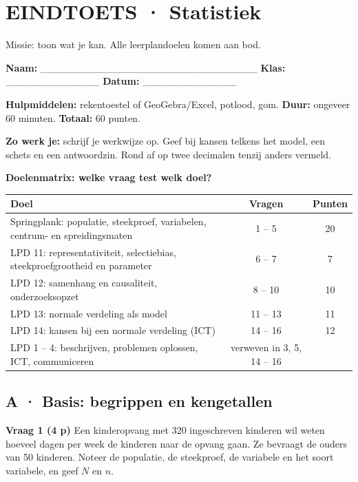 \section{EINDTOETS · Statistiek}

\begin{missie}
Missie: toon wat je kan. Alle leerplandoelen komen aan bod.
\end{missie}

\textbf{Naam:} \_\_\_\_\_\_\_\_\_\_\_\_\_\_\_\_\_\_\_\_\_\_\_\_\_\_\_\_\_\_ \quad \textbf{Klas:} \_\_\_\_\_\_\_\_\_\_\_\_\_ \quad \textbf{Datum:} \_\_\_\_\_\_\_\_\_\_\_\_\_

\textbf{Hulpmiddelen:} rekentoestel of GeoGebra/Excel, potlood, gom. \quad \textbf{Duur:} ongeveer 60 minuten. \quad \textbf{Totaal:} 60 punten.

\begin{letop}
\textbf{Zo werk je:} schrijf je werkwijze op. Geef bij kansen telkens het model, een schets en een antwoordzin. Rond af op twee decimalen tenzij anders vermeld.
\end{letop}

\textbf{Doelenmatrix: welke vraag test welk doel?}

\begin{tabular}{lcc}
\hline
Doel & Vragen & Punten \\
\hline
Springplank: populatie, steekproef, variabelen, centrum- en spreidingsmaten & 1 – 5 & 20 \\
LPD 11: representativiteit, selectiebias, steekproefgrootheid en parameter & 6 – 7 & 7 \\
LPD 12: samenhang en causaliteit, onderzoeksopzet & 8 – 10 & 10 \\
LPD 13: normale verdeling als model & 11 – 13 & 11 \\
LPD 14: kansen bij een normale verdeling (ICT) & 14 – 16 & 12 \\
LPD 1 – 4: beschrijven, problemen oplossen, ICT, communiceren & verweven in 3, 5, 14 – 16 & \\
\hline
\end{tabular}

\subsection*{A · Basis: begrippen en kengetallen}

\textbf{Vraag 1 \quad (4 p)} Een kinderopvang met 320 ingeschreven kinderen wil weten hoeveel dagen per week de kinderen naar de opvang gaan. Ze bevraagt de ouders van 50 kinderen. Noteer de populatie, de steekproef, de variabele en het soort variabele, en geef $N$ en $n$. \lijn

